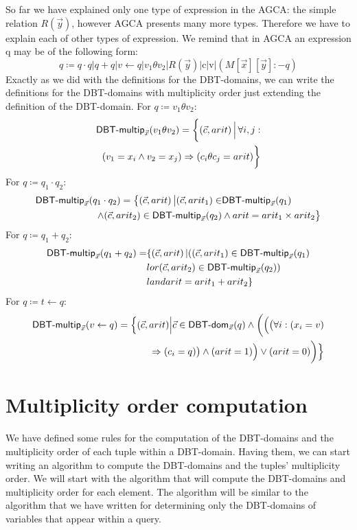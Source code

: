 \documentclass[12pt]{article}
\begin{document}
So far we have explained only one type of expression in the AGCA: the simple relation $R(\vec y)$, however AGCA presents many more types. Therefore we have to explain each of other types of expression. We remind that in AGCA an expression q may be of the following form:
\begin{equation}
q\coloneqq q\cdot q | q + q|v \gets q |v_{1}\theta v_{2}|R(\vec{y})|\text{c}|\text{v}|(M[\vec{x}][\vec{y}]:-q)
\end{equation}
Exactly as we did with the definitions for the DBT-domains, we can write the definitions for the DBT-domains with multiplicity order just extending the definition of the DBT-domain. For $q\coloneqq v_{1}\theta v_{2}$:
\begin{align}
\text{\textsf{DBT-multip}{}}_{\vec{x}}(v_{1}\theta v_{2})=\bigg\{(\vec{c},arit)\,\Big|\,\forall i,j:\nonumber\\(v_{1}=x_{i}\land v_{2}=x_{j})\Rightarrow (c_{i}\theta c_{j}=arit)\bigg\}
\end{align}
For $q\coloneqq q_{1}\cdot q_{2}$:
\begin{align} 
\text{\textsf{DBT-multip}}_{\vec{x}}(q_{1}\cdot q_{2})=\big\{(\vec{c},arit)\,\big|(\vec{c},arit_{1})\in&\text{\textsf{DBT-multip}}_{\vec{x}}(q_{1})\nonumber\\\land (\vec{c},arit_{2})\in\text{\textsf{DBT-multip}{}}_{\vec{x}}(q_{2})& \land arit= arit_{1}\times arit_{2}\big\}
\end{align}
For $q\coloneqq q_{1}+q_{2}$:
\begin{align}
\text{\textsf{DBT-multip}{}}_{\vec{x}}(q_{1}+ q_{2})=&\{(\vec{c},arit)\,|((\vec{c},arit_{1})\in\text{\textsf{DBT-multip}{}}_{\vec{x}}(q_{1})\nonumber\\&lor(\vec{c},arit_{2})\in\text{\textsf{DBT-multip}{}}_{\vec{x}}(q_{2}))\nonumber\\&land arit=arit_{1}+arit_{2}\}
\end{align}
For $q\coloneqq t\gets q$:
\begin{align}
\text{\textsf{DBT-multip}{}}_{\vec{x}}(v\gets q)=\Big\{(\vec{c},arit)\Big|\vec{c}\in\text{\textsf{DBT-dom}{}}_{\vec{x}}(q)\land \bigg(\Big(\big(\forall i: (x_{i}=v) & \nonumber\\\Rightarrow(c_{i}=q)\big)\land (arit=1)\Big)\lor (arit=0)\bigg)\Big\}
\end{align}

\section{Multiplicity order computation}

We have defined some rules for the computation of the DBT-domains and the multiplicity order of each tuple within a DBT-domain. Having them, we can start writing an algorithm to compute the DBT-domains and the tuples' multiplicity order. We will start with the algorithm that will compute the DBT-domains and multiplicity order for each element. The algorithm will be similar to the algorithm that we have written for determining only the DBT-domains of variables that appear within a query.
\end{document}
